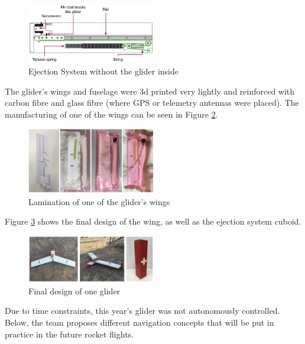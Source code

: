 \begin{figure}[h!]
    \centering
        \includegraphics[width=0.5\textwidth]{img/ejection_system.JPG}
        \caption{Ejection System without the glider inside}
        \label{fig:ejection}
 \end{figure}

The glider's wings and fuselage were 3d printed very lightly and reinforced with carbon fibre and glass fibre (where GPS or telemetry antennas were placed). The manufacturing of one of the wings can be seen in Figure \ref{fig:manufact}.

\begin{figure}[h!]
    \centering
        \includegraphics[width=0.5\textwidth]{img/manuf.png}
        \caption{Lamination of one of the glider's wings}
        \label{fig:manufact}
 \end{figure}


Figure \ref{fig:final} shows the final design of the wing, as well as the ejection system cuboid.



\begin{figure}[h!]
    \centering
        \includegraphics[width=0.5\textwidth]{img/final.png}
        \caption{Final design of one glider}
        \label{fig:final}
 \end{figure}

Due to time constraints, this year's glider was not autonomously controlled. Below, the team proposes different navigation concepts that will be put in practice in the future rocket flights.


